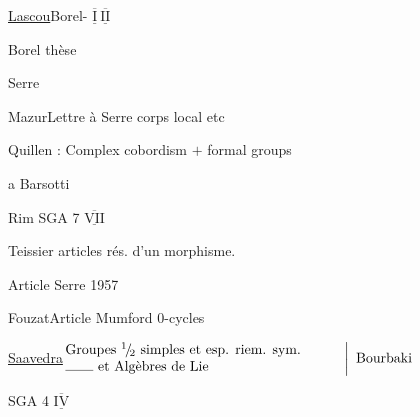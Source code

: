 \uline{Lascou}\qquad Borel- $\overline{\underline{\mathrm I}}\ \overline{\underline{\mathrm {II}}}$

Borel thèse

Serre 

Mazur\qquad Lettre à Serre corps  local etc


Quillen : Complex cobordism $+$ formal groups

 a Barsotti

Rim SGA 7 $\overline{\underline{\mathrm{VII}}}$

Teissier articles  rés. d'un morphisme.

\qquad Article Serre 1957

Fouzat\qquad Article Mumford $0$-cycles

\uline{Saavedra}\qquad \(\left.\begin{array}{@{}p{.58\linewidth}@{}}Groupes ${}^{1}\!/\!{}_{2}$ simples et esp. riem. sym.\\\rule{2em}{.35pt} et Algèbres de Lie\end{array}\right\vert\ \text{Bourbaki}\)

SGA 4 $\overline{\underline{\mathrm{IV}}}$

\clearpage

